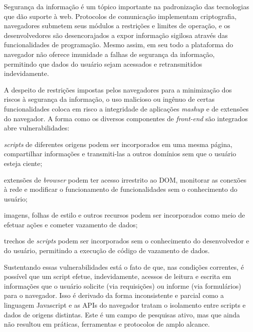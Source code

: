 Segurança da informação é um tópico importante na padronização das tecnologias que dão suporte à web. Protocolos de comunicação implementam criptografia, navegadores submetem seus módulos a restrições e limites de operação, e os desenvolvedores são desencorajados a expor informação sigilosa através das funcionalidades de programação. Mesmo assim, em seu todo a plataforma do navegador não oferece imunidade a falhas de segurança da informação, permitindo que dados do usuário sejam acessados e retransmitidos indevidamente.

A despeito de restrições impostas pelos navegadores para a minimização dos riscos à segurança da informação, o uso malicioso ou ingênuo de certas funcionalidades coloca em risco a integridade de aplicações \textit{mashup} e de extensões do navegador. A forma como os diversos componentes de \textit{front-end} são integrados abre vulnerabilidades:

\begin{alineas}
	\item \textit{scripts} de diferentes origens podem ser incorporados em uma mesma página, compartilhar informações e transmiti-las a outros domínios sem que o usuário esteja ciente;
	\item extensões de \textit{browser} podem ter acesso irrestrito ao DOM, monitorar as conexões à rede e modificar o funcionamento de funcionalidades sem o conhecimento do usuário;
	\item imagens, folhas de estilo e outros recursos podem ser incorporados como meio de efetuar ações e cometer vazamento de dados;
	\item trechos de \textit{scripts} podem ser incorporados sem o conhecimento do desenvolvedor e do usuário, permitindo a execução de código de vazamento de dados.
\end{alineas}

Sustentando essas vulnerabilidades está o fato de que, nas condições correntes, é possível que um script efetue, indevidamente, acessos de leitura e escrita em informações que o usuário solicite (via requisições) ou informe (via formulários) para o navegador. Isso é derivado da forma inconsistente e parcial como a linguagem Javascript e as APIs do navegador tratam o isolamento entre scripts e dados de origens distintas. Este é um campo de pesquisas ativo, mas que ainda não resultou em práticas, ferramentas e protocolos de amplo alcance.





